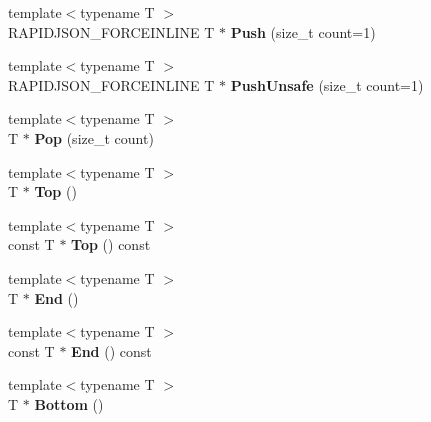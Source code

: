\begin{DoxyCompactItemize}
\item 
{\footnotesize template$<$typename T $>$ }\\R\+A\+P\+I\+D\+J\+S\+O\+N\+\_\+\+F\+O\+R\+C\+E\+I\+N\+L\+I\+NE T $\ast$ {\bfseries Push} (size\+\_\+t count=1)\hypertarget{classinternal_1_1_stack_a8038223ec0ed6ea92bb5f48e645a25ca}{}\label{classinternal_1_1_stack_a8038223ec0ed6ea92bb5f48e645a25ca}

\item 
{\footnotesize template$<$typename T $>$ }\\R\+A\+P\+I\+D\+J\+S\+O\+N\+\_\+\+F\+O\+R\+C\+E\+I\+N\+L\+I\+NE T $\ast$ {\bfseries Push\+Unsafe} (size\+\_\+t count=1)\hypertarget{classinternal_1_1_stack_a63b4eabd209d4fc9b43027f4e5660532}{}\label{classinternal_1_1_stack_a63b4eabd209d4fc9b43027f4e5660532}

\item 
{\footnotesize template$<$typename T $>$ }\\T $\ast$ {\bfseries Pop} (size\+\_\+t count)\hypertarget{classinternal_1_1_stack_a8545a8ccba595ac6e4ade9784474aa1c}{}\label{classinternal_1_1_stack_a8545a8ccba595ac6e4ade9784474aa1c}

\item 
{\footnotesize template$<$typename T $>$ }\\T $\ast$ {\bfseries Top} ()\hypertarget{classinternal_1_1_stack_ab3ed5b4afed3c73c516678516d5e195b}{}\label{classinternal_1_1_stack_ab3ed5b4afed3c73c516678516d5e195b}

\item 
{\footnotesize template$<$typename T $>$ }\\const T $\ast$ {\bfseries Top} () const \hypertarget{classinternal_1_1_stack_aa76b4cd53b9c3c65e544d14565eda7ae}{}\label{classinternal_1_1_stack_aa76b4cd53b9c3c65e544d14565eda7ae}

\item 
{\footnotesize template$<$typename T $>$ }\\T $\ast$ {\bfseries End} ()\hypertarget{classinternal_1_1_stack_a54987ae8ad774dd3ee80a43d268ef080}{}\label{classinternal_1_1_stack_a54987ae8ad774dd3ee80a43d268ef080}

\item 
{\footnotesize template$<$typename T $>$ }\\const T $\ast$ {\bfseries End} () const \hypertarget{classinternal_1_1_stack_a439ba97dc85710d469c65c1815dd4484}{}\label{classinternal_1_1_stack_a439ba97dc85710d469c65c1815dd4484}

\item 
{\footnotesize template$<$typename T $>$ }\\T $\ast$ {\bfseries Bottom} ()\hypertarget{classinternal_1_1_stack_a10aa1bc716b82cb0a40b3a3b9d5efe87}{}\label{classinternal_1_1_stack_a10aa1bc716b82cb0a40b3a3b9d5efe87}


\end{DoxyCompactItemize}
